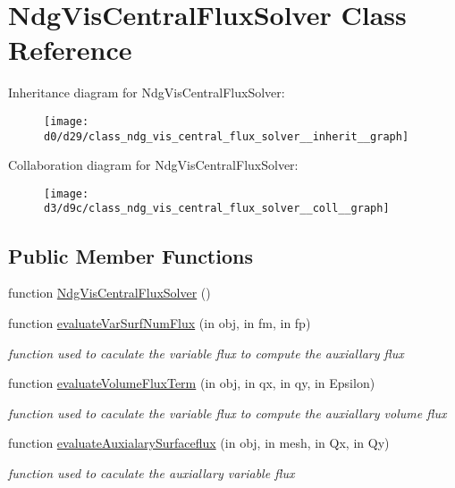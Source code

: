 \hypertarget{class_ndg_vis_central_flux_solver}{}\section{Ndg\+Vis\+Central\+Flux\+Solver Class Reference}
\label{class_ndg_vis_central_flux_solver}


Inheritance diagram for Ndg\+Vis\+Central\+Flux\+Solver\+:
\nopagebreak
\begin{figure}[H]
\begin{center}
\leavevmode
\texttt{[image: d0/d29/class\_ndg\_vis\_central\_flux\_solver\_\_inherit\_\_graph]}
\end{center}
\end{figure}


Collaboration diagram for Ndg\+Vis\+Central\+Flux\+Solver\+:
\nopagebreak
\begin{figure}[H]
\begin{center}
\leavevmode
\texttt{[image: d3/d9c/class\_ndg\_vis\_central\_flux\_solver\_\_coll\_\_graph]}
\end{center}
\end{figure}
\subsection*{Public Member Functions}
\begin{DoxyCompactItemize}
\item 
function \hyperlink{class_ndg_vis_central_flux_solver_ad7033f4e338194e26ae50f16258a4cc8}{Ndg\+Vis\+Central\+Flux\+Solver} ()
\item 
function \hyperlink{class_ndg_vis_central_flux_solver_a1fa51d9658f91514731fd5ef52344f78}{evaluate\+Var\+Surf\+Num\+Flux} (in obj, in fm, in fp)
\begin{DoxyCompactList}\small\item\em function used to caculate the variable flux to compute the auxiallary flux \end{DoxyCompactList}\item 
function \hyperlink{class_ndg_vis_central_flux_solver_a41a3aeb7b361a0c993cc1ea654144910}{evaluate\+Volume\+Flux\+Term} (in obj, in qx, in qy, in Epsilon)
\begin{DoxyCompactList}\small\item\em function used to caculate the variable flux to compute the auxiallary volume flux \end{DoxyCompactList}\item 
function \hyperlink{class_ndg_vis_central_flux_solver_ac570459fbbea19359360e4be013c3827}{evaluate\+Auxialary\+Surfaceflux} (in obj, in mesh, in Qx, in Qy)
\begin{DoxyCompactList}\small\item\em function used to caculate the auxiallary variable flux \end{DoxyCompactList}\end{DoxyCompactItemize}


